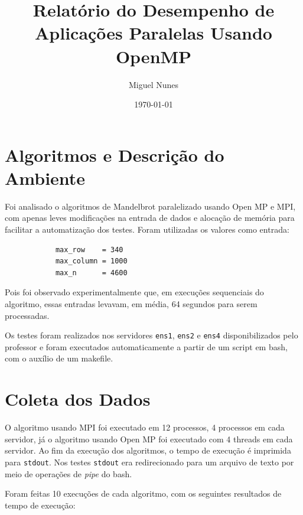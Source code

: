 \documentclass[10pt,a4paper]{article}
\title{Relatório do Desempenho de Aplicações Paralelas Usando OpenMP}
\author{Miguel Nunes}
\date{\today}
\begin{document}
	\maketitle

	\section{Algoritmos e Descrição do Ambiente}

		Foi analisado o algoritmos de Mandelbrot paralelizado usando Open MP e MPI, 
		com apenas leves modificações na entrada de dados e alocação de memória para facilitar a automatização dos testes.
		Foram utilizadas os valores como entrada: 
		
		\begin{verbatim}
			max_row    = 340
			max_column = 1000
			max_n      = 4600
		\end{verbatim}

		Pois foi observado experimentalmente que, em execuções sequenciais do algoritmo, essas entradas levavam, em média, 
		64 segundos para serem processadas.

		Os testes foram realizados nos servidores \texttt{ens1}, \texttt{ens2} e \texttt{ens4} disponibilizados pelo professor e
		foram executados automaticamente a partir de um script em bash, com o auxílio de um makefile.

	\section{Coleta dos Dados}
		O algoritmo usando MPI foi executado em 12 processos, 4 processos em cada servidor, já o algoritmo usando Open MP foi executado
		com 4 threads em cada servidor.
		Ao fim da execução dos algoritmos, o tempo de execução é imprimida para \texttt{stdout}. 
		Nos testes \texttt{stdout} era redirecionado para um arquivo de texto por meio de operações de \textit{pipe} do bash.

		Foram feitas 10 execuções de cada algoritmo, com os seguintes resultados de tempo de execução:

		\clearpage
\end{document}
